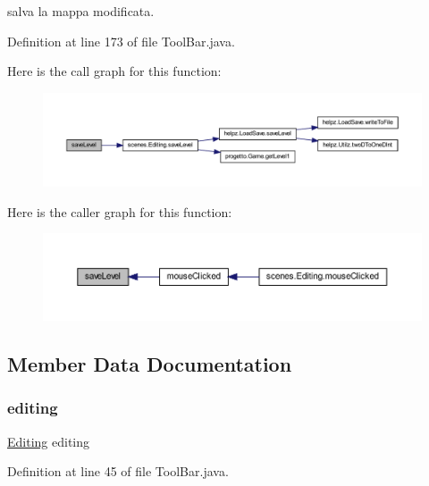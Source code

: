 salva la mappa modificata. 



Definition at line 173 of file Tool\+Bar.\+java.

Here is the call graph for this function\+:
\nopagebreak
\begin{figure}[H]
\begin{center}
\leavevmode
\includegraphics[width=350pt]{classui_1_1_tool_bar_af1c1bf274cd89c18726a992a073a7c6d_cgraph}
\end{center}
\end{figure}
Here is the caller graph for this function\+:\nopagebreak
\begin{figure}[H]
\begin{center}
\leavevmode
\includegraphics[width=350pt]{classui_1_1_tool_bar_af1c1bf274cd89c18726a992a073a7c6d_icgraph}
\end{center}
\end{figure}


\subsection{Member Data Documentation}
\mbox{\label{classui_1_1_tool_bar_a38f9dcf960197192269b03c788903b3e}} 
\subsubsection{\texorpdfstring{editing}{editing}}
{\footnotesize\ttfamily \hyperlink{classscenes_1_1_editing}{Editing} editing\hspace{0.3cm}{\ttfamily [private]}}



Definition at line 45 of file Tool\+Bar.\+java.

